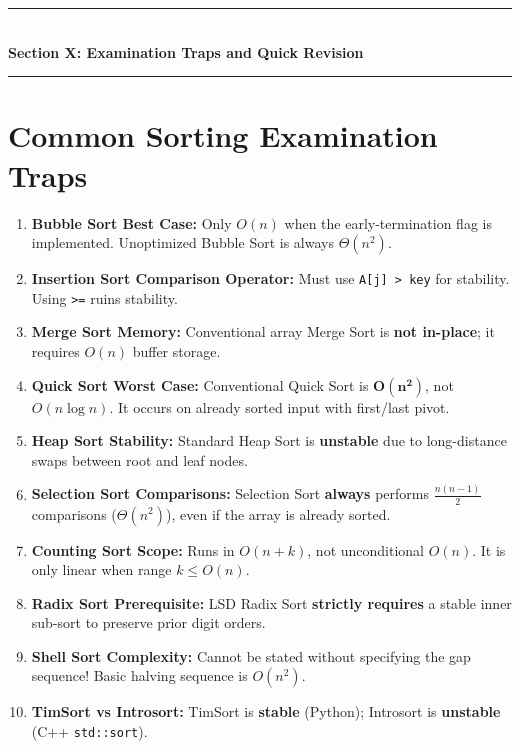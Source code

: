 \newpage
\begin{center}
\vspace{0.5em}
{\color{primary}\rule{0.45\textwidth}{1.2pt}}\\[4pt]
{\Large\bfseries\color{primary} Section X: Examination Traps and Quick Revision}\\[2pt]
{\color{primary}\rule{0.45\textwidth}{1.2pt}}
\vspace{0.5em}
\end{center}

\section{Common Sorting Examination Traps}

\begin{enumerate}
    \item \textbf{Bubble Sort Best Case:} Only $O(n)$ when the early-termination flag is implemented. Unoptimized Bubble Sort is always $\Theta(n^2)$.
    \item \textbf{Insertion Sort Comparison Operator:} Must use \texttt{A[j] > key} for stability. Using \texttt{>=} ruins stability.
    \item \textbf{Merge Sort Memory:} Conventional array Merge Sort is \textbf{not in-place}; it requires $O(n)$ buffer storage.
    \item \textbf{Quick Sort Worst Case:} Conventional Quick Sort is $\mathbf{O(n^2)}$, not $O(n \log n)$. It occurs on already sorted input with first/last pivot.
    \item \textbf{Heap Sort Stability:} Standard Heap Sort is \textbf{unstable} due to long-distance swaps between root and leaf nodes.
    \item \textbf{Selection Sort Comparisons:} Selection Sort \textbf{always} performs $\frac{n(n-1)}{2}$ comparisons ($\Theta(n^2)$), even if the array is already sorted.
    \item \textbf{Counting Sort Scope:} Runs in $O(n + k)$, not unconditional $O(n)$. It is only linear when range $k \leq O(n)$.
    \item \textbf{Radix Sort Prerequisite:} LSD Radix Sort \textbf{strictly requires} a stable inner sub-sort to preserve prior digit orders.
    \item \textbf{Shell Sort Complexity:} Cannot be stated without specifying the gap sequence! Basic halving sequence is $O(n^2)$.
    \item \textbf{TimSort vs Introsort:} TimSort is \textbf{stable} (Python); Introsort is \textbf{unstable} (C++ \texttt{std::sort}).
\end{enumerate}


